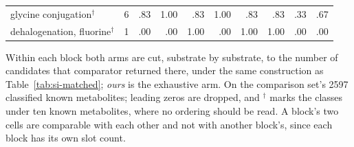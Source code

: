 \begin{table}[h]
\begin{threeparttable}
\begin{tabular}{@{}lrrrrrrrrr@{}}
glycine conjugation$^{\dagger}$ & 6 & .83 & 1.00 & .83 & 1.00 & .83 & .83 & .33 & .67 \\
dehalogenation, fluorine$^{\dagger}$ & 1 & .00 & .00 & 1.00 & .00 & 1.00 & 1.00 & .00 & .00 \\
\bottomrule
\end{tabular}
\begin{tablenotes}[flushleft]\footnotesize
\item Within each block both arms are cut, substrate by substrate, to the number of candidates that comparator returned there, under the same construction as Table~\ref{tab:si-matched}; \emph{ours} is the exhaustive arm. On the comparison set's 2597 classified known metabolites; leading zeros are dropped, and $^{\dagger}$ marks the classes under ten known metabolites, where no ordering should be read. A block's two cells are comparable with each other and not with another block's, since each block has its own slot count.
\end{tablenotes}
\end{threeparttable}
\end{table}

